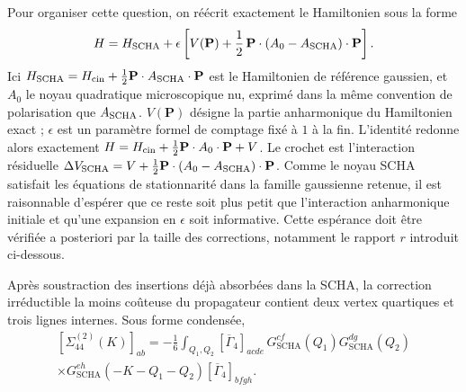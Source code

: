Pour organiser cette question, on réécrit exactement le Hamiltonien sous la
forme
\begin{equation}
H=H_{\rm SCHA}
+\epsilon\left[
V(\mathbf P)+\frac12\,\mathbf P\mathbin{\cdot}(A_0-A_{\rm SCHA})
\mathbin{\cdot}\mathbf P
\right].
\label{eq:core_post_scha_reorganization}
\end{equation}
Ici $H_{\rm SCHA}=H_{\rm cin}+\tfrac12\mathbf P\cdot A_{\rm SCHA}\cdot\mathbf P$
est le Hamiltonien de référence gaussien, et $A_0$ le noyau quadratique
microscopique nu, exprimé dans la même convention de polarisation que
$A_{\rm SCHA}$. $V(\mathbf P)$ désigne la partie anharmonique du Hamiltonien
exact ; $\epsilon$ est un paramètre formel de comptage fixé à $1$ à la fin.
L'identité redonne alors exactement
$H=H_{\rm cin}+\tfrac12\mathbf P\cdot A_0\cdot\mathbf P+V$.
Le crochet est l'interaction résiduelle
$\Delta V_{\rm SCHA}=V+\tfrac12\mathbf P\cdot(A_0-A_{\rm SCHA})\cdot\mathbf P$.
Comme le noyau SCHA satisfait les équations de stationnarité dans la famille
gaussienne retenue, il est raisonnable d'espérer que ce reste soit
plus petit que l'interaction anharmonique initiale et qu'une expansion en
$\epsilon$ soit informative. Cette espérance doit être vérifiée a posteriori par la taille des corrections, notamment le rapport $r$ introduit ci-dessous.

Après soustraction des insertions déjà absorbées dans la SCHA, la correction
irréductible la moins coûteuse du propagateur contient deux vertex quartiques
et trois lignes internes. Sous forme condensée,
\begin{equation}
\begin{aligned}
[\Sigma_{44}^{(2)}(K)]_{ab}
=-\frac{1}{6}\int_{Q_1,Q_2}
[\overline\Gamma_4]_{acde}\,
G^{cf}_{\mathrm{SCHA}}(Q_1)
G^{dg}_{\mathrm{SCHA}}(Q_2)\\
\times G^{eh}_{\mathrm{SCHA}}(-K-Q_1-Q_2)
[\overline\Gamma_4]_{bfgh}.
\end{aligned}
\label{eq:ann_sunset}
\end{equation}

